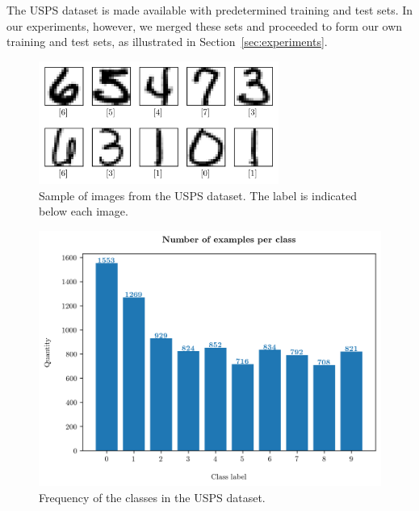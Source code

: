 \documentclass[runningheads]{llncs}
\begin{document}
The USPS dataset is made available with predetermined training and test sets. In our experiments, however, we merged these sets and proceeded to form our own training and test sets, as illustrated in Section~\ref{sec:experiments}. 

\begin{figure}
  \center
  \includegraphics[width=0.7\textwidth]{../img/digits.png}
  \caption{Sample of images from the USPS dataset. The label is indicated below each image.} 
  \label{fig:dataset:digits}
\end{figure}

\begin{figure}
  \center
  \includegraphics[width=1\textwidth]{../img/class_counts.png}
  \caption{Frequency of the classes in the USPS dataset.} 
  \label{fig:dataset:class_counts}
\end{figure}
\end{document}
